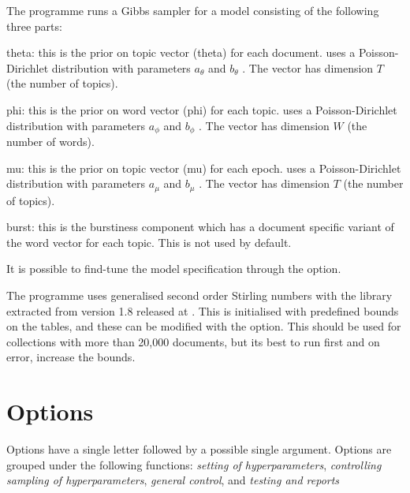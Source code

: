 \documentclass[a4paper,english]{article}
\begin{document}
The programme runs a Gibbs sampler for a model consisting of the following three parts:
\begin{Description}[model]
\item[theta:] this is the prior on topic vector (theta) for each document.
 uses a Poisson-Dirichlet distribution with parameters $a_{\theta}$ and  $b_{\theta}$ .
The vector has dimension $T$ (the number of topics).

\item[phi:] this is the prior on word vector  (phi) for each topic. 
 uses a Poisson-Dirichlet distribution with parameters $a_{\phi}$ and  $b_{\phi}$ .
The vector has dimension $W$ (the number of words).

\item[mu:] this is the prior on topic vector (mu) for each epoch.
 uses a Poisson-Dirichlet distribution with parameters $a_{\mu}$ and  $b_{\mu}$ .
The vector has dimension $T$ (the number of topics).

\item[burst:]  this is the burstiness component which has
a document specific variant of the word vector for
each topic.  This is not used by default.
\end{Description}

It is possible to find-tune the model specification through the
 option.

The programme uses generalised second order Stirling numbers
with the library extracted from  version 1.8
released at .
This is initialised with predefined bounds on the tables,
and these can be modified with the  option.
This should be used for collections with more than
20,000 documents, but its best to run first and on
error, increase the bounds.


\section{Options}

Options have a single letter followed by a possible
single argument. Options are grouped under
the following functions:
\emph{setting of hyperparameters}, 
\emph{controlling sampling of hyperparameters},
\emph{general control}, and
\emph{testing and reports}
\end{document}
